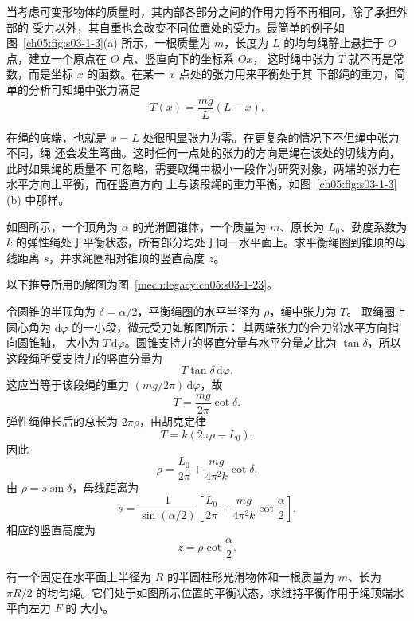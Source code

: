 {当考虑可变形物体的质量时，其内部各部分之间的作用力将不再相同，除了承担外部的
受力以外，其自重也会改变不同位置处的受力。最简单的例子如图~\ref{ch05:fig:s03-1-3}(a) 所示，一根质量为
$m$，长度为 $L$ 的均匀绳静止悬挂于 $O$ 点，建立一个原点在 $O$ 点、竖直向下的坐标系 $Ox$，
这时绳中张力 $T$ 就不再是常数，而是坐标 $x$ 的函数。在某一 $x$ 点处的张力用来平衡处于其
下部绳的重力，简单的分析可知绳中张力满足
\[
  T(x)=\frac{mg}{L}(L-x).
\]

在绳的底端，也就是 $x=L$ 处很明显张力为零。在更复杂的情况下不但绳中张力不同，绳
还会发生弯曲。这时任何一点处的张力的方向是绳在该处的切线方向，此时如果绳的质量不
可忽略，需要取绳中极小一段作为研究对象，两端的张力在水平方向上平衡，而在竖直方向
上与该段绳的重力平衡，如图~\ref{ch05:fig:s03-1-3}(b) 中那样。

\label{ch05:fig:s03-1-3}

\begin{origexamplebox}{}\label{ch05:ex:s03-1-23}
如图所示，一个顶角为 $\alpha$ 的光滑圆锥体，一个质量为 $m$、原长为 $L_0$、劲度系数为
$k$ 的弹性绳处于平衡状态，所有部分均处于同一水平面上。求平衡绳圈到锥顶的母线距离
$s$，并求绳圈相对锥顶的竖直高度 $z$。
\end{origexamplebox}

\begin{xesolution}
以下推导所用的解图为图~\ref{mech:legacy:ch05:s03-1-23}。

令圆锥的半顶角为 $\delta=\alpha/2$，平衡绳圈的水平半径为 $\rho$，绳中张力为 $T$。
取绳圈上圆心角为 $\mathrm d\varphi$ 的一小段，微元受力如解图所示：
\soldiagOneTwentyThree
其两端张力的合力沿水平方向指向圆锥轴，
大小为 $T\,\mathrm d\varphi$。圆锥支持力的竖直分量与水平分量之比为 $\tan\delta$，所以
这段绳所受支持力的竖直分量为
\[
  T\tan\delta\,\mathrm d\varphi.
\]
这应当等于该段绳的重力 $(mg/2\pi)\,\mathrm d\varphi$，故
\[
  T=\frac{mg}{2\pi}\cot\delta.
\]
弹性绳伸长后的总长为 $2\pi\rho$，由胡克定律
\[
  T=k(2\pi\rho-L_0).
\]
因此
\[
  \rho=\frac{L_0}{2\pi}+\frac{mg}{4\pi^2k}\cot\delta.
\]
由 $\rho=s\sin\delta$，母线距离为
\[
  \boxed{s=\frac{1}{\sin(\alpha/2)}
  \left[\frac{L_0}{2\pi}+\frac{mg}{4\pi^2k}\cot\frac\alpha2\right]}.
\]
相应的竖直高度为
\[
  \boxed{z=\rho\cot\frac\alpha2}.
\]
\end{xesolution}

\begin{origexamplebox}{}\label{ch05:ex:s03-1-24}
有一个固定在水平面上半径为 $R$ 的半圆柱形光滑物体和一根质量为 $m$、长为 $\pi R/2$
的均匀绳。它们处于如图所示位置的平衡状态，求维持平衡作用于绳顶端水平向左力 $F$ 的
大小。
\end{origexamplebox}

}

